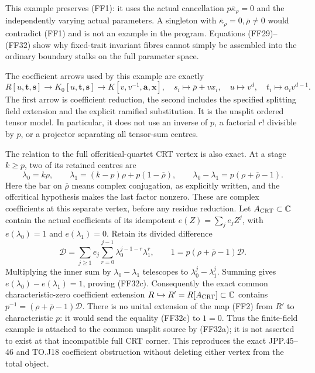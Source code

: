 \documentclass[11pt,a4paper]{article}
\theoremstyle{definition}
\begin{document}
This example preserves (FF1): it uses the actual cancellation
\(p\bar\kappa_\rho=0\) and the independently varying actual
parameters.  A singleton with
\(\bar\kappa_\rho=0,\bar\rho\ne0\) would contradict (FF1) and
is not an example in the program.  Equations (FF29)--(FF32)
show why fixed-trait invariant fibres cannot simply be assembled
into the ordinary boundary stalks on the full parameter space.

The coefficient arrows used by this example are exactly
\[
 R[u,\boldsymbol t,\boldsymbol s]\longrightarrow
 K_0[u,\boldsymbol t,\boldsymbol s]\longrightarrow
 K[v,v^{-1},\boldsymbol a,\boldsymbol x],
 \quad
 s_i\longmapsto\bar\rho+vx_i,\quad
 u\longmapsto v^d,\quad t_i\longmapsto a_i v^{d-1}.
                                                               \tag{FF32a}
\]
The first arrow is coefficient reduction, the second includes the
specified splitting field extension and the explicit ramified
substitution.  It is the unsplit ordered tensor model.  In particular,
it does not use an inverse of \(p\), a factorial \(r!\) divisible
by \(p\), or a projector separating all tensor-sum centres.

The relation to the full offcritical-quartet CRT vertex is also exact.
At a stage \(k\ge p\), two of its retained centres are
\[
 \lambda_0=k\rho,\qquad
 \lambda_1=(k-p)\rho+p(1-\overline\rho),\qquad
 \lambda_0-\lambda_1=p(\rho+\overline\rho-1).
                                                               \tag{FF32b}
\]
Here the bar on \(\overline\rho\) means complex conjugation,
as explicitly written, and the offcritical hypothesis makes the
last factor nonzero.  These are complex coefficients at this
separate vertex, before any residue reduction.
Let \(A_{\rm CRT}\subset\mathbb C\) contain the actual coefficients
of its idempotent \(e(Z)=\sum_j e_jZ^j\), with
\(e(\lambda_0)=1\) and \(e(\lambda_1)=0\).
Retain its divided difference
\[
 \mathscr D=\sum_{j\ge1}e_j
             \sum_{r=0}^{j-1}\lambda_0^{j-1-r}\lambda_1^r,
 \qquad
       1=p(\rho+\overline\rho-1)\mathscr D.             \tag{FF32c}
\]
Multiplying the inner sum by \(\lambda_0-\lambda_1\)
telescopes to \(\lambda_0^j-\lambda_1^j\).  Summing gives
\(e(\lambda_0)-e(\lambda_1)=1\), proving (FF32c).
Consequently the exact common characteristic-zero coefficient
extension \(R\hookrightarrow R'=R[A_{\rm CRT}]\subset\mathbb C\)
contains
\(p^{-1}=(\rho+\overline\rho-1)\mathscr D\).
There is no unital extension of the map (FF2) from \(R'\) to
characteristic \(p\): it would send the equality (FF32c) to
\(1=0\).  Thus the finite-field example is attached to the common
unsplit source by (FF32a); it is not asserted to exist at that
incompatible full CRT corner.  This reproduces the exact
JPP.45--46 and TO.J18 coefficient obstruction without deleting
either vertex from the total object.
\end{document}
